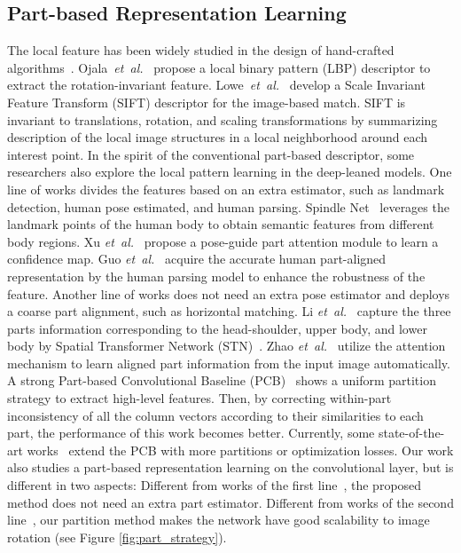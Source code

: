 \documentclass[journal]{IEEEtran}
\def\etal{\emph{et~al.}}
\begin{document}
\subsection{Part-based Representation Learning}
The local feature has been widely studied in the design of hand-crafted algorithms~\cite{amit2007pop,crandall2005spatial,fergus2003object,leibe2008robust,weber2000towards}. Ojala~\etal~\cite{LBP} propose a local binary pattern (LBP) descriptor to extract the rotation-invariant feature. Lowe~\etal~\cite{SIFT} develop a Scale Invariant Feature Transform (SIFT) descriptor for the image-based match. SIFT is invariant to translations, rotation, and scaling transformations by summarizing description of the local image structures in a local neighborhood around each interest point. 
In the spirit of the conventional part-based descriptor, some researchers also explore the local pattern learning in the deep-leaned models.
One line of works divides the features based on an extra estimator, such as landmark detection, human pose estimated, and human parsing. 
Spindle Net~\cite{zhao_spindle_2017} leverages the landmark points of the human body to obtain semantic features from different body regions. 
Xu \etal~\cite{xu_attention-aware_2018} propose a pose-guide part attention module to learn a confidence map. 
Guo \etal~\cite{guo_beyond_2019} acquire the accurate human part-aligned representation by the human parsing model to enhance the robustness of the feature.
Another line of works does not need an extra pose estimator and deploys a coarse part alignment, such as horizontal matching. Li \etal~\cite{li_learning_2017} capture the three parts information corresponding to the head-shoulder, upper body, and lower body by Spatial Transformer Network (STN)~\cite{zheng2018pedestrian,jaderberg_spatial_2015}. Zhao \etal~\cite{zhao_deeply-learned_2017} utilize the attention mechanism to learn aligned part information from the input image automatically. A strong Part-based Convolutional Baseline (PCB)~\cite{sun_beyond_2018} shows a uniform partition strategy to extract high-level features. Then, by correcting within-part inconsistency of all the column vectors according to their similarities to each part, the performance of this work becomes better. Currently, some state-of-the-art works~\cite{sun_dissecting_2019,zhong_invariance_2019,song_generalizable_2019,fu2019horizontal} extend the PCB with more partitions or optimization losses. 
Our work also studies a part-based representation learning on the convolutional layer, but is different in two aspects: 
Different from works of the first line~\cite{xu_attention-aware_2018,zhao_spindle_2017,zheng_pose-invariant_2019,su_pose-driven_2017,wei_glad_2019}, the proposed method does not need an extra part estimator. Different from works of the second line~\cite{zheng2018pedestrian,sun_beyond_2018,sun_dissecting_2019,zhong_invariance_2019}, our partition method makes the network have good scalability to image rotation (see Figure \ref{fig:part_strategy}).
\end{document}
